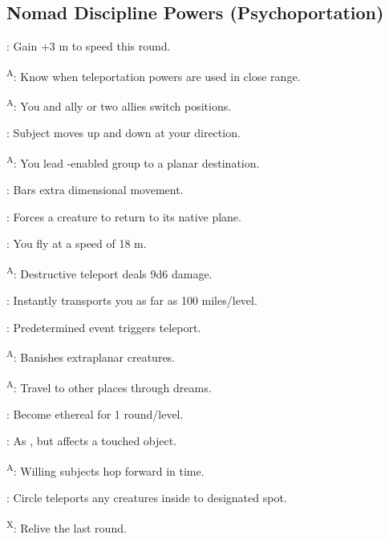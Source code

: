 \subsection{Nomad Discipline Powers {\normalsize(Psychoportation)}}
\begin{enumerate*}
\item {}: Gain +3 m to speed this round.

\textsuperscript{A}: Know when teleportation powers are used in close range.

\item {}\textsuperscript{A}: You and ally or two allies switch positions.

: Subject moves up and down at your direction.

\item {}\textsuperscript{A}: You lead -enabled group to a planar destination.
\item {}: Bars extra dimensional movement.

: Forces a creature to return to its native plane.

: You fly at a speed of 18 m.

\item {}\textsuperscript{A}: Destructive teleport deals 9d6 damage.

: Instantly transports you as far as 100 miles/level.

: Predetermined event triggers teleport.

\item {}\textsuperscript{A}: Banishes extraplanar creatures.
\item {}\textsuperscript{A}: Travel to other places through dreams.

: Become ethereal for 1 round/level.

: As , but affects a touched object. %

\item {}\textsuperscript{A}: Willing subjects hop forward in time.
\item {}: Circle teleports any creatures inside to designated spot.

\textsuperscript{X}: Relive the last round.
\end{enumerate*}



